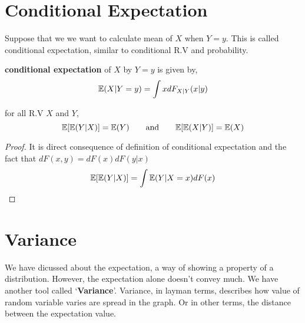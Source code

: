 \section{Conditional Expectation}
Suppose that we we want to calculate mean of $X$ when $Y=y$. This is called conditional expectation, similar to conditional R.V and probability.
\begin{definition} \textbf{conditional expectation} of $X$ by $Y=y$ is given by,
\[{\mathbb{E}}(X | Y=y) = \int x dF_{X|Y}(x|y)\]
\end{definition}
\begin{theorem} for all R.V $X$ and $Y$,
    \[{\mathbb{E}}[{\mathbb{E}}(Y|X)] = {\mathbb{E}}(Y) \qquad \text{and} \qquad  {\mathbb{E}}[{\mathbb{E}}(X|Y)] = {\mathbb{E}}(X)\]
    \begin{proof}
        It is direct consequence of definition of conditional expectation and the fact that $dF(x,y) = dF(x)dF(y|x)$
        \[ {\mathbb{E}}[{\mathbb{E}}(Y|X)] = \int {\mathbb{E}}(Y|X=x) dF(x)\]
    \end{proof}
\end{theorem}
\section{Variance}
We have dicussed about the expectation, a way of showing a property of a distribution. However, the expectation alone doesn't convey much. We have another tool called `\textbf{Variance}'.
Variance, in layman terms, describes how value of random variable varies are spread in the graph. Or in other terms, the distance between the expectation value. 
\par

